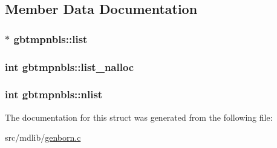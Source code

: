 \subsection{\-Member \-Data \-Documentation}
\hypertarget{structgbtmpnbls_a4ee7381816706cd6097d8e2fac14517c}{
\subsubsection[{list}]{$\ast$ {\bf gbtmpnbls\-::list}}}\label{structgbtmpnbls_a4ee7381816706cd6097d8e2fac14517c}
\hypertarget{structgbtmpnbls_abbace6b246b8c5f96278672ab38c3be4}{
\subsubsection[{list\-\_\-nalloc}]{\setlength{\rightskip}{0pt plus 5cm}int {\bf gbtmpnbls\-::list\-\_\-nalloc}}}\label{structgbtmpnbls_abbace6b246b8c5f96278672ab38c3be4}
\hypertarget{structgbtmpnbls_aa28c407bff14afd6e0bce3e73d1113b3}{
\subsubsection[{nlist}]{\setlength{\rightskip}{0pt plus 5cm}int {\bf gbtmpnbls\-::nlist}}}\label{structgbtmpnbls_aa28c407bff14afd6e0bce3e73d1113b3}


\-The documentation for this struct was generated from the following file\-:\begin{DoxyCompactItemize}
\item 
src/mdlib/\hyperlink{genborn_8c}{genborn.\-c}\end{DoxyCompactItemize}
